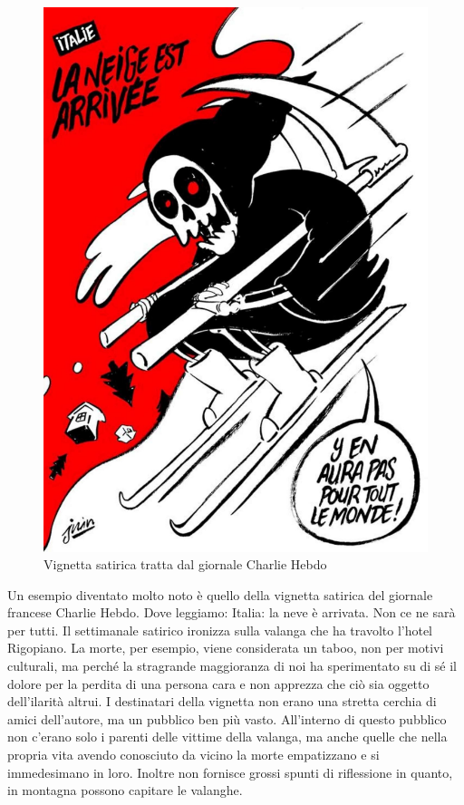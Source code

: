 \documentclass[12pt]{book} %
\begin{document}
\begin{mdframed}[linewidth=1pt]
\begin{figure}
  \centering
  \includegraphics[width=0.95\linewidth]{images/Libro-img032.jpg}
  \begin{minipage}{\linewidth}
    \caption{Vignetta satirica tratta dal giornale Charlie Hebdo}
  \end{minipage}
\end{figure}

Un esempio diventato molto noto è quello della vignetta satirica del giornale francese Charlie Hebdo. Dove
leggiamo: {\textquotedbl}Italia: la neve è arrivata. Non ce ne sarà per tutti{\textquotedbl}. Il settimanale satirico
ironizza sulla valanga che ha travolto l'hotel Rigopiano. La morte, per esempio, viene considerata un taboo,
non per motivi culturali, ma perché la stragrande maggioranza di noi ha sperimentato su di sé il dolore per la perdita
di una persona cara e non apprezza che ciò sia oggetto dell'ilarità altrui. I destinatari della
vignetta non erano una stretta cerchia di amici dell'autore, ma un pubblico ben più vasto.
All'interno di questo pubblico non c'erano solo i parenti delle vittime della
valanga, ma anche quelle che nella propria vita avendo conosciuto da vicino la morte empatizzano e si immedesimano in
loro. Inoltre non fornisce grossi spunti di riflessione in quanto, in montagna possono capitare le valanghe.


\end{mdframed}
\end{document}
